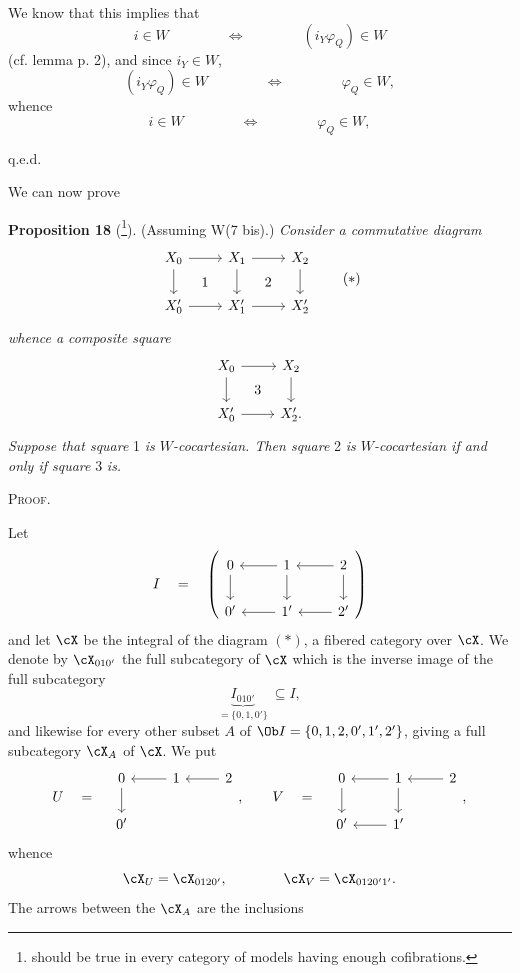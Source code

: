 We know that this implies that
\[
i \in W \qquad\qquad \Longleftrightarrow \qquad\qquad (i_Y\varphi_Q) \in W
\]
(cf. lemma p. 2), and since $i_Y \in W$,
\[
(i_Y\varphi_Q) \in W \qquad\qquad \Longleftrightarrow \qquad\qquad \varphi_Q \in W,
\]
whence
\[
i \in W \qquad\qquad \Longleftrightarrow \qquad\qquad \varphi_Q \in W,
\]

\hfill q.e.d.

We can now prove


\textbf{Proposition 18} (\footnote[127]{should be true in every category of models having enough cofibrations.}). (Assuming W(7 bis).) \textit{Consider a commutative diagram}
\[
\begin{tikzcd}[ampersand replacement=\&]
X_0 \arrow[r] \arrow[d] \arrow[rd, phantom, "1"] \& X_1 \arrow[r] \arrow[d] \arrow[rd, phantom, "2"] \& X_2 \arrow[d] \\
X'_0 \arrow[r] \& X'_1 \arrow[r] \& X'_2
\end{tikzcd}
\tag*{$(\ast)$}
\]
\textit{whence a composite square}
\[
\begin{tikzcd}[ampersand replacement=\&]
X_0 \arrow[r] \arrow[d] \arrow[rd, phantom, "3"] \& X_2 \arrow[d] \\
X'_0 \arrow[r] \& X'_2.
\end{tikzcd}
\]
\textit{Suppose that square} 1 \textit{is $W$-cocartesian. Then square} 2 \textit{is $W$-cocartesian if and only if square} 3 \textit{is.}

\textsc{Proof.}




Let
\[
I \quad = \quad
\left(
\begin{tikzcd}[ampersand replacement=\&]
0 \arrow[d] \& 1 \arrow[l] \arrow[d] \& 2 \arrow[l] \arrow[d] \\
0' \& 1' \arrow[l] \& 2' \arrow[l]
\end{tikzcd}
\right)
\]
and let $\cX$ be the integral of the diagram $(\ast)$, a fibered category over $\cX$. We denote by $\cX_{010'}$ the full subcategory of $\cX$ which is the inverse image of the full subcategory %
\[
\underbrace{I_{010'}}_{=\{0,1,0'\}} \ \subseteq I,
\]
and likewise for every other subset $A$ of $\Ob I = \{0,1,2,0',1',2'\}$, giving a full subcategory $\cX_A$ of $\cX$. We put
\[
U \quad = \quad
\begin{tikzcd}[ampersand replacement=\&]
0 \arrow[d] \& 1 \arrow[l] \& 2 \arrow[l] \\
0' \& \&
\end{tikzcd}
, \qquad
V \quad = \quad
\begin{tikzcd}[ampersand replacement=\&]
0 \arrow[d] \& 1 \arrow[l] \arrow[d] \& 2 \arrow[l] \\
0' \& 1' \arrow[l] \&
\end{tikzcd}
,
\]
whence
\[
\cX_U = \cX_{0120'}, \qquad\qquad \cX_V = \cX_{0120'1'}.
\]
The arrows between the $\cX_A$ are the inclusions

